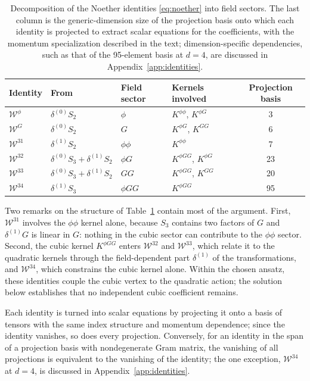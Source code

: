\documentclass[prd,aps,preprint,superscriptaddress,nofootinbib,amsmath,amssymb,eqsecnum]{revtex4-2}
\newcommand{\W}{\mathcal{W}}
\providecommand{\DIFaddbegin}{} %
\begin{document}
\begin{table}[htb]
\centering
\begin{tabular}{@{}llllc@{}}
\toprule
Identity & From & Field sector & Kernels involved & Projection basis \\
\midrule
$\W^{\phi}$  & $\delta^{(0)}S_2$ & $\phi$   & $K^{\phi\phi}$, $K^{\phi G}$ & 3 \\
$\W^{G}$     & $\delta^{(0)}S_2$ & $G$      & $K^{\phi G}$, $K^{GG}$ & 6 \\
$\W^{31}$    & $\delta^{(1)}S_2$ & $\phi\phi$ & $K^{\phi\phi}$ & 7 \\
$\W^{32}$    & $\delta^{(0)}S_3+\delta^{(1)}S_2$ & $\phi G$ & $K^{\phi GG}$, $K^{\phi G}$ & 23 \\
$\W^{33}$    & $\delta^{(0)}S_3+\delta^{(1)}S_2$ & $GG$ & $K^{\phi GG}$, $K^{GG}$ & 20 \\
$\W^{34}$    & $\delta^{(1)}S_3$ & $\phi GG$ & $K^{\phi GG}$ & 95 \\
\bottomrule
\end{tabular}
\caption{Decomposition of the Noether identities \eqref{eq:noether} into field sectors. The
last column is the generic-dimension size of the projection basis onto which each identity
is projected to extract scalar equations for the coefficients, with the momentum
specialization described in the text; dimension-specific dependencies, such as that of the
95-element basis at $d=4$, are discussed in Appendix~\ref{app:identities}.}
\label{tab:identities}
\end{table}

Two remarks on the structure of Table~\ref{tab:identities} contain most of the argument. First,
$\W^{31}$ involves the $\phi\phi$ kernel alone, because $S_3$ contains two factors of $G$ and
$\delta^{(1)}G$ is linear in $G$: nothing in the cubic sector can contribute to the $\phi\phi$ sector.
Second, the cubic kernel $K^{\phi GG}$ enters $\W^{32}$ and $\W^{33}$, which relate it to
the quadratic kernels through the field-dependent part $\delta^{(1)}$ of the
transformations, and $\W^{34}$, which constrains the cubic kernel alone. Within the chosen
ansatz, these identities couple the cubic vertex to the quadratic action; the solution
below establishes that no independent cubic coefficient remains.

Each identity is turned into scalar equations by projecting it onto a basis of tensors with
the same index structure and momentum dependence; since the identity vanishes, so does every
projection. Conversely, for an identity in the span of a projection basis with nondegenerate
Gram matrix, the vanishing of all projections is equivalent to the vanishing of the identity;
the one exception, $\W^{34}$ at $d=4$, is discussed in Appendix~\ref{app:identities}.
\DIFaddbegin 
\end{document}
